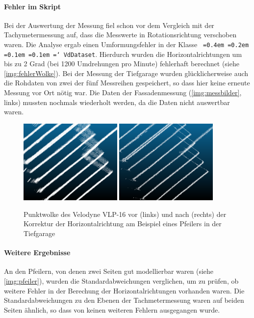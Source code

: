 \documentclass[a4paper,12pt,bibliography=totoc, listof=totoc,titlepage,pointlessnumbers]{scrreprt}
\newcommand*\justify{%
  \fontdimen2\font=0.4em%
  \fontdimen3\font=0.2em%
  \fontdimen4\font=0.1em%
  \fontdimen7\font=0.1em%
  \hyphenchar\font=`\-%
}
\newcommand{\code}[1]{\texttt{\justify{#1}}}
\begin{document}
\paragraph{Fehler im Skript} Bei der Auswertung der Messung fiel schon vor dem Vergleich mit der Tachymetermessung auf, dass die Messwerte in Rotationsrichtung verschoben waren. Die Analyse ergab einen Umformungsfehler in der Klasse \code{VdDataset}. Hierdurch wurden die Horizontalrichtungen um bis zu 2 Grad (bei 1200 Umdrehungen pro Minute) fehlerhaft berechnet (siehe \autoref{img:fehlerWolke}). Bei der Messung der Tiefgarage wurden glücklicherweise auch die Rohdaten von zwei der fünf Messreihen gespeichert, so dass hier keine erneute Messung vor Ort nötig war. Die Daten der Fassadenmessung (\autoref{img:messbilder}, links) mussten nochmals wiederholt werden, da die Daten nicht auswertbar waren.

\begin{figure}[!ht]
 \centering
 \includegraphics[width=0.45\textwidth]{./img/punktwolke_f.png}
 \includegraphics[width=0.45\textwidth]{./img/punktwolke_k.png}
 \caption{Punktwolke des Velodyne VLP-16 vor (links) und nach (rechts) der Korrektur der Horizontalrichtung am Beispiel eines Pfeilers in der Tiefgarage}
 \label{img:fehlerWolke}
\end{figure}

\paragraph{Weitere Ergebnisse}
An den Pfeilern, von denen zwei Seiten gut modellierbar waren (siehe \autoref{img:pfeiler}), wurden die Standardabweichungen verglichen, um zu prüfen, ob weitere Fehler in der Berechung der Horizontalrichtungen vorhanden waren. Die Standardabweichungen zu den Ebenen der Tachmetermessung waren auf beiden Seiten ähnlich, so dass von keinen weiteren Fehlern ausgegangen wurde.
\end{document}
